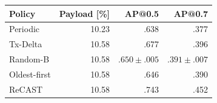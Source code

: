 \begin{tabular}{lrrr}
\toprule
Policy & Payload [\%] & AP@0.5 & AP@0.7\\
\midrule
Periodic & 10.23 & .638 & .377\\
Tx-Delta & 10.58 & .677 & .396\\
Random-B & 10.58 & $.650{\pm}.005$ & $.391{\pm}.007$\\
Oldest-first & 10.58 & .646 & .390\\
ReCAST & 10.58 & .743 & .452\\
\bottomrule
\end{tabular}
